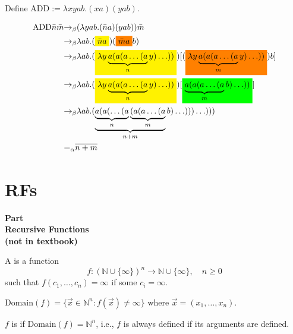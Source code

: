 \begin{frame}

Define $\text{ADD}:=\lambda xyab.(xa)(yab)$.

\begin{align*}
\text{ADD}\bar{n}\bar{m}
&\rab (\lambda yab.(\bar{n}a)(yab))\bar{m} \\
&\rab \lambda ab.(\text{\colorbox{yellow}{$\bar{n}a$}})
(\text{\colorbox{orange}{$\bar{m}a$}}b) \\
&\rab \lambda ab.(
\text{\colorbox{yellow}{$\lambda
y\underbrace{a(a(a\ldots(a}_{n}y)\ldots))$}})
[(\text{\colorbox{orange}{$\lambda
y\underbrace{a(a(a\ldots(a}_{m}y)\ldots))$}})b] \\
&\rab \lambda ab.(
\text{\colorbox{yellow}{$\lambda
y\underbrace{a(a(a\ldots(a}_{n}y)\ldots))$}})
[\text{\colorbox{green}{$\underbrace{a(a(a\ldots(a}_{m}b)\ldots))$}}] \\
&\rab \lambda ab.(\underbrace{\underbrace{a(a(\ldots(a}_{n}
\underbrace{(a(a\ldots(a}_{m}}_{n+m}b)\ldots)))\ldots))) \\
&\aeq\overline{n+m}
\end{align*}
\end{frame}

\section{RFs}

\begin{frame}
\begin{center}
\addtocounter{part}{1}
{\bf Part  \\ Recursive Functions \\ (not in textbook)} 
\end{center}
\end{frame}

\begin{frame}

A  is a function
$$
f:(\mathbb{N}\cup\{\infty\})^n\longrightarrow
\mathbb{N}\cup\{\infty\}, \quad n\ge 0
$$
such that $f(c_1,\ldots,c_n)=\infty$ if some $c_i=\infty$.

$\text{Domain}(f)=\{\vec{x}\in\mathbb{N}^n:f(\vec{x})\neq\infty\}$
where $\vec{x}=(x_1,\ldots,x_n)$.

$f$ is  if $\text{Domain}(f)=\mathbb{N}^n$, i.e., $f$ is
always defined if its arguments are defined.
\end{frame}

